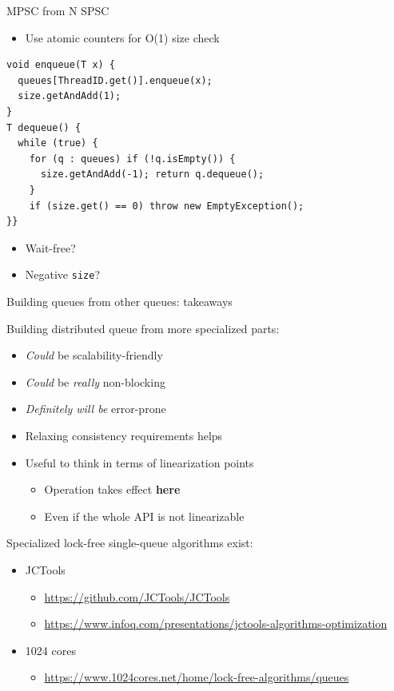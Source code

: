 \begin{frame}[t,fragile]{MPSC from N SPSC}

\begin{itemize}
  \item Use atomic counters for O(1) size check
\end{itemize}

\begin{verbatim}
void enqueue(T x) {  
  queues[ThreadID.get()].enqueue(x);
  size.getAndAdd(1);
}
T dequeue() {
  while (true) {
    for (q : queues) if (!q.isEmpty()) {
      size.getAndAdd(-1); return q.dequeue();
    }
    if (size.get() == 0) throw new EmptyException();
}}
\end{verbatim}

\begin{itemize}
  \pause \item Wait-free?
  \pause \item Negative \texttt{size}?
\end{itemize}

\end{frame}


\begin{frame}[t,fragile]{Building queues from other queues: takeaways}

Building distributed queue from more specialized parts:
\begin{itemize}
  \pause \item \textit{Could} be scalability-friendly
  \pause \item \textit{Could} be \textit{really} non-blocking
  \pause \item \textit{Definitely will be} error-prone
  \pause \item Relaxing consistency requirements helps
  \pause \item Useful to think in terms of linearization points
  \begin{itemize}
    \pause \item Operation takes effect \textbf{here}
    \pause \item Even if the whole API is not linearizable
  \end{itemize}
\end{itemize}

\pause

Specialized lock-free single-queue algorithms exist: 
\begin{itemize}
  \item JCTools 
  \begin{itemize}
    \item \url{https://github.com/JCTools/JCTools}
    \item \url{https://www.infoq.com/presentations/jctools-algorithms-optimization}
  \end{itemize}
  \item 1024 cores
  \begin{itemize}
    \item \url{https://www.1024cores.net/home/lock-free-algorithms/queues}  
  \end{itemize}
\end{itemize}
\end{frame}


